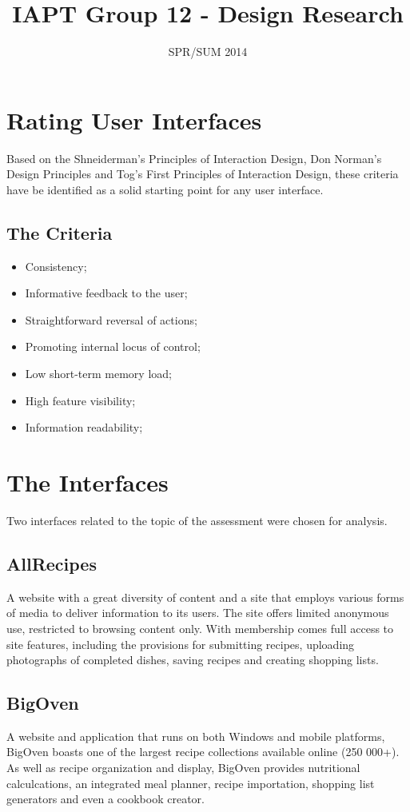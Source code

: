\documentclass{article}
\title{IAPT Group 12 - Design Research}
\date{SPR/SUM 2014}
\begin{document}
\maketitle
\clearpage

\section*{Rating User Interfaces}
Based on the Shneiderman's Principles of Interaction Design, Don Norman's Design Principles and Tog's First Principles of Interaction Design, these criteria have be identified as a solid starting point for any user interface.

\subsection*{The Criteria}
\begin{itemize}
  \item Consistency;
  \item Informative feedback to the user;
  \item Straightforward reversal of actions;
  \item Promoting internal locus of control;
  \item Low short-term memory load;
  \item High feature visibility;
  \item Information readability;
\end{itemize}

\clearpage

\section*{The Interfaces}
Two interfaces related to the topic of the assessment were chosen for analysis.

\subsection*{AllRecipes}
A website with a great diversity of content and a site that employs various forms 
of media to deliver information to its users. The site offers limited anonymous
use, restricted to browsing content only. With membership comes full access to 
site features, including the provisions for submitting recipes, uploading
photographs of completed dishes, saving recipes and creating shopping lists.

\subsection*{BigOven}
A website and application that runs on both Windows and mobile platforms, BigOven
boasts one of the largest recipe collections available online (250 000+). As well
as recipe organization and display, BigOven provides nutritional calculcations,
an integrated meal planner, recipe importation, shopping list generators and even 
a cookbook creator.
\end{document}
